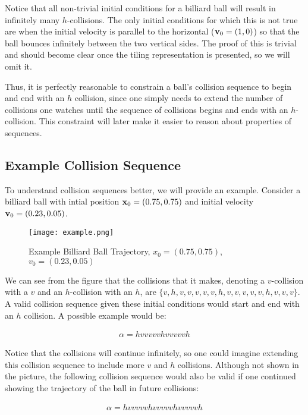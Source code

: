 Notice that all non-trivial initial conditions for a billiard ball will result in infinitely many $h$-collisions. The only initial conditions for which this is not true are when the initial velocity is parallel to the horizontal ($\mathbf{v}_0 = (1, 0)$) so that the ball bounces infinitely between the two vertical sides. The proof of this is trivial and should become clear once the tiling representation is presented, so we will omit it.

Thus, it is perfectly reasonable to constrain a ball's collision sequence to begin and end with an $h$ collision, since one simply needs to extend the number of collisions one watches until the sequence of collisions begins and ends with an $h$-collision. This constraint will later make it easier to reason about properties of sequences.

\subsection{Example Collision Sequence}

To understand collision sequences better, we will provide an example. Consider a billiard ball with intial position $\mathbf{x}_0 = (0.75, 0.75)$ and initial velocity $\mathbf{v}_0 = (0.23, 0.05)$.

\begin{figure}
  \texttt{[image: example.png]}
  \caption{\label{fig:example}Example Billiard Ball Trajectory, $x_0 = (0.75, 0.75)$, $v_0 = (0.23, 0.05)$}
\end{figure}

We can see from the figure that the collisions that it makes, denoting a $v$-collision with a $v$ and an $h$-collision with an $h$, are $\{v, h, v, v, v, v, v, h, v, v, v, v, v, h, v, v, v\}$. A valid collision sequence given these initial conditions would start and end with an $h$ collision. A possible example would be:

\begin{eqnarray}
  \alpha = hvvvvvhvvvvvh
\end{eqnarray}

Notice that the collisions will continue infinitely, so one could imagine extending this collision sequence to include more $v$ and $h$ collisions. Although not shown in the picture, the following collision sequence would also be valid if one continued showing the trajectory of the ball in future collisions:

\begin{eqnarray}
  \alpha = hvvvvvhvvvvvhvvvvvh
\end{eqnarray}

